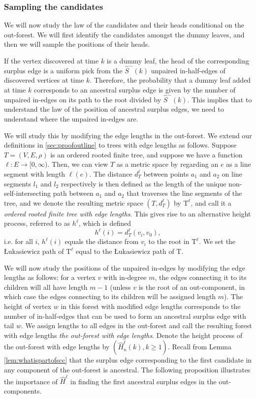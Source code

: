 \subsubsection{Sampling the candidates}\label{subsubsec.samplecandidates}
We will now study the law of the candidates and their heads conditional on the out-forest. We will first identify the candidates amongst the dummy leaves, and then we will sample the positions of their heads. 


If the vertex discovered at time $k$ is a dummy leaf, the head of the corresponding surplus edge is a uniform pick from the $\hat{S}^-(k)$ unpaired in-half-edges of discovered vertices at time $k$. Therefore, the probability that a dummy leaf added at time $k$ corresponds to an ancestral surplus edge is given by the number of unpaired in-edges on its path to the root divided by $\hat{S}^-(k)$. This implies that to understand the law of the position of ancestral surplus edges, we need to understand where the unpaired in-edges are. 


We will study this by modifying the edge lengths in the out-forest. We extend our definitions in \cref{sec:proofoutline} to trees with edge lengths as follows. Suppose $T=(V,E,\rho)$ is an ordered rooted finite tree, and suppose we have a function $\ell:E\to [0,\infty)$. Then, we can view $T$ as a metric space by regarding an $e$ as a line segment with length $\ell(e)$. The distance $d^\ell_T$ between points $a_1$ and $a_2$ on line segments $l_1$ and $l_2$ respectively is then defined as the length of the unique non-self-intersecting path between $a_1$ and $a_2$ that traverses the line segments of the tree, and we denote the resulting metric space $(T,d^\ell_T)$ by $\mathrm{T}^\ell$, and call it a \emph{ordered rooted finite tree with edge lengths}. This gives rise to an alternative height process, referred to as $h^\ell$, which is defined $$h^\ell(i)=d^\ell_T(v_i,v_0),$$ i.e.  for all $i$, $h^\ell(i)$ equals the distance from $v_i$ to the root in $\mathrm{T}^\ell$. We set the \L ukasiewicz path of $\mathrm{T}^\ell$ equal to the \L ukasiewicz path of $\mathrm{T}$.

We will now study the positions of the unpaired in-edges by modifying the edge lengths as follows: for a vertex $v$ with in-degree $m$, the edges connecting it to its children will all have length $m-1$ (unless $v$ is the root of an out-component, in which case the edges connecting to its children will be assigned length $m$). The height of vertex $w$ in this forest with modified edge lengths corresponds to the number of in-half-edges that can be used to form an ancestral surplus edge with tail $w$. We assign lengths to all edges in the out-forest and call the resulting forest with edge lengths \emph{the out-forest with edge lengths}. Denote the height process of the out-forest with edge lengths by $(\hat{H}_n^\ell(k),k\geq 1)$. 
Recall from Lemma \ref{lem:whatispartofscc} that the surplus edge corresponding to the first candidate in any component of the out-forest is ancestral. The following proposition illustrates the importance of $\hat{H}^\ell$ in finding the first ancestral surplus edges in the out-components.

